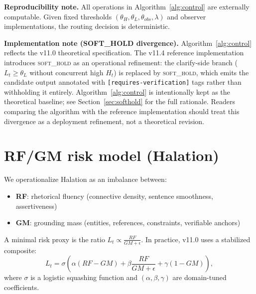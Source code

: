 \documentclass[11pt,a4paper]{article}
\begin{document}
\textbf{Reproducibility note.} All operations in Algorithm~\ref{alg:control} are externally
computable. Given fixed thresholds $(\theta_H, \theta_L, \theta_{obs}, \lambda)$ and observer
implementations, the routing decision is deterministic.

\textbf{Implementation note (SOFT\_HOLD divergence).}
Algorithm~\ref{alg:control} reflects the v11.0 theoretical specification.
The v11.4 reference implementation introduces \textsc{soft\_hold} as an operational
refinement: the clarify-side branch ($L_t \geq \theta_L$ without concurrent high $H_t$)
is replaced by \textsc{soft\_hold}, which emits the candidate output annotated with
\texttt{[requires-verification]} tags rather than withholding it entirely.
Algorithm~\ref{alg:control} is intentionally kept as the theoretical baseline;
see Section~\ref{sec:softhold} for the full rationale.
Readers comparing the algorithm with the reference implementation should treat this
divergence as a deployment refinement, not a theoretical revision.

\section{RF/GM risk model (Halation)}

We operationalize Halation as an imbalance between:
\begin{itemize}
\item \textbf{RF}: rhetorical fluency (connective density, sentence smoothness, assertiveness)
\item \textbf{GM}: grounding mass (entities, references, constraints, verifiable anchors)
\end{itemize}

A minimal risk proxy is the ratio $L_t \propto \frac{RF}{GM+\epsilon}$. In practice, v11.0
uses a stabilized composite:
\begin{equation}
L_t = \sigma\!\left(\alpha(RF - GM) + \beta\frac{RF}{GM + \epsilon} + \gamma(1 - GM)\right),
\label{eq:lt}
\end{equation}
where $\sigma$ is a logistic squashing function and $(\alpha, \beta, \gamma)$ are domain-tuned
coefficients.
\end{document}
